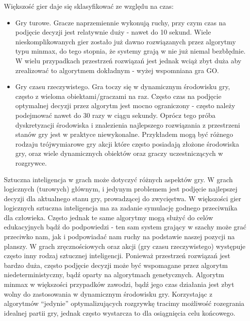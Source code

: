\begin{par}
Większość gier daje się sklasyfikować ze względu na czas:
\begin{itemize}
	\item Gry turowe. Gracze naprzemiennie wykonują ruchy, przy czym czas na podjęcie decyzji jest relatywnie duży - nawet do 10 sekund. 
Wiele nieskomplikowanych gier zostało już dawno rozwiązanych przez algorytmy typu minmax, do tego stopnia, że systemy grają w nie już niemal bezbłędnie. 
W wielu przypadkach przestrzeń rozwiązań jest jednak wciąż zbyt duża aby zrealizować to algorytmem dokładnym - wyżej wspomniana gra GO.
	\item Gry czasu rzeczywistego. Gra toczy się w dynamicznym środowisku gry, często z wieloma obiektami/graczami na raz. Często czas na podjęcie optymalnej decyzji przez algorytm jest mocno ograniczony - często należy podejmować nawet do 30 razy w ciągu sekundy. Oprócz tego próba dyskretyzacji środowiska i znalezienia najlepszego rozwiązania z przestrzeni stanów gry jest w praktyce niewykonalne. Przykładem mogą być różnego rodzaju trójwymiarowe gry akcji które często posiadają złożone środowiska gry, oraz wiele dynamicznych obiektów oraz graczy uczestniczących w rozgrywce.
\end{itemize}
Sztuczna inteligencja w grach może dotyczyć różnych aspektów gry. 
W grach logicznych (turowych) głównym, i jedynym problemem jest podjęcie najlepszej decyzji dla aktualnego stanu gry, prowadzącej do zwycięstwa. 
W większości gier logicznych sztuczna inteligencja ma za zadanie symulację godnego przeciwnika dla człowieka.
Często jednak te same algorytmy mogą służyć do celów edukacyjnych bądź do podpowiedzi - ten sam system grający w szachy może grać przeciwko nam, jak i podpowiadać nam ruchy na podstawie naszej pozycji na planszy.
W grach zręcznościowych oraz akcji (gry czasu rzeczywistego) występuje często inny rodzaj sztucznej inteligencji.
Ponieważ przestrzeń rozwiązań jest bardzo duża, często podjęcie decyzji może być wspomagane przez algorytm niedeterministyczny, bądź oparty na algorytmach genetycznych.
Algorytm minmax w większości przypadków zawodzi, bądź jego czas działania jest zbyt wolny do zastosowania w dynamicznym środowisku gry.
Korzystając z algorytmów ``jedynie'' optymalizujących rozgrywkę tracimy możliwość rozegrania idealnej partii gry, jednak często wystarcza to dla osiągnięcia celu końcowego.
\end{par}



